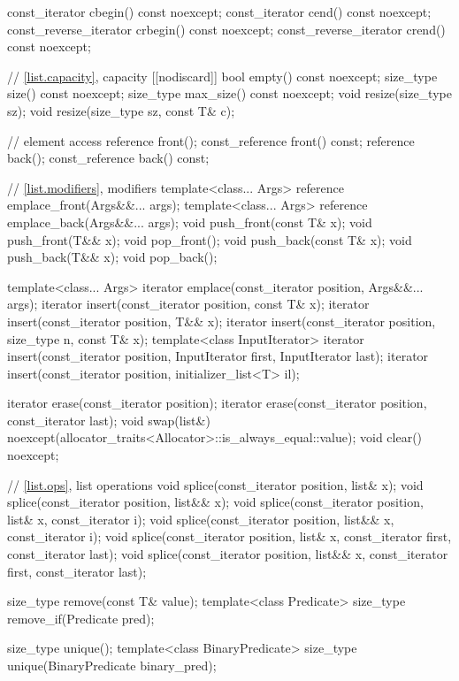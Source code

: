 \begin{codeblock}
{{    const_iterator         cbegin() const noexcept;
    const_iterator         cend() const noexcept;
    const_reverse_iterator crbegin() const noexcept;
    const_reverse_iterator crend() const noexcept;

    // \ref{list.capacity}, capacity
    [[nodiscard]] bool empty() const noexcept;
    size_type size() const noexcept;
    size_type max_size() const noexcept;
    void      resize(size_type sz);
    void      resize(size_type sz, const T& c);

    // element access
    reference       front();
    const_reference front() const;
    reference       back();
    const_reference back() const;

    // \ref{list.modifiers}, modifiers
    template<class... Args> reference emplace_front(Args&&... args);
    template<class... Args> reference emplace_back(Args&&... args);
    void push_front(const T& x);
    void push_front(T&& x);
    void pop_front();
    void push_back(const T& x);
    void push_back(T&& x);
    void pop_back();

    template<class... Args> iterator emplace(const_iterator position, Args&&... args);
    iterator insert(const_iterator position, const T& x);
    iterator insert(const_iterator position, T&& x);
    iterator insert(const_iterator position, size_type n, const T& x);
    template<class InputIterator>
      iterator insert(const_iterator position, InputIterator first, InputIterator last);
    iterator insert(const_iterator position, initializer_list<T> il);

    iterator erase(const_iterator position);
    iterator erase(const_iterator position, const_iterator last);
    void     swap(list&) noexcept(allocator_traits<Allocator>::is_always_equal::value);
    void     clear() noexcept;

    // \ref{list.ops}, list operations
    void splice(const_iterator position, list& x);
    void splice(const_iterator position, list&& x);
    void splice(const_iterator position, list& x, const_iterator i);
    void splice(const_iterator position, list&& x, const_iterator i);
    void splice(const_iterator position, list& x, const_iterator first, const_iterator last);
    void splice(const_iterator position, list&& x, const_iterator first, const_iterator last);

    size_type remove(const T& value);
    template<class Predicate> size_type remove_if(Predicate pred);

    size_type unique();
    template<class BinaryPredicate>
      size_type unique(BinaryPredicate binary_pred);

}}
\end{codeblock}
